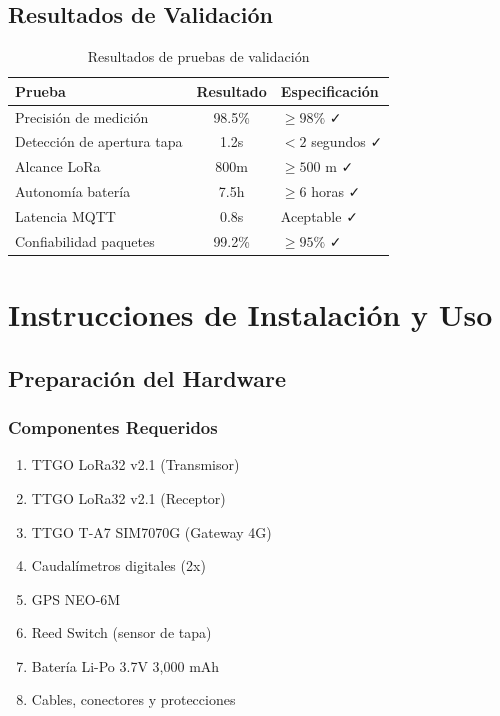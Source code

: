 \documentclass[12pt,a4paper,oneside]{report}
\begin{document}
\section{Resultados de Validación}

\begin{table}[H]
    \centering
    \begin{tabular}{|l|c|l|}
        \hline
        \textbf{Prueba} & \textbf{Resultado} & \textbf{Especificación} \\
        \hline
        Precisión de medición & 98.5\% & $\geq 98\%$ ✓ \\
        Detección de apertura tapa & 1.2s & $< 2$ segundos ✓ \\
        Alcance LoRa & 800m & $\geq 500$ m ✓ \\
        Autonomía batería & 7.5h & $\geq 6$ horas ✓ \\
        Latencia MQTT & 0.8s & Aceptable ✓ \\
        Confiabilidad paquetes & 99.2\% & $\geq 95\%$ ✓ \\
        \hline
    \end{tabular}
    \caption{Resultados de pruebas de validación}
\end{table}

\chapter{Instrucciones de Instalación y Uso}

\section{Preparación del Hardware}

\subsection{Componentes Requeridos}

\begin{enumerate}
    \item TTGO LoRa32 v2.1 (Transmisor)
    \item TTGO LoRa32 v2.1 (Receptor)
    \item TTGO T-A7 SIM7070G (Gateway 4G)
    \item Caudalímetros digitales (2x)
    \item GPS NEO-6M
    \item Reed Switch (sensor de tapa)
    \item Batería Li-Po 3.7V 3,000 mAh
    \item Cables, conectores y protecciones
\end{enumerate}
\end{document}
